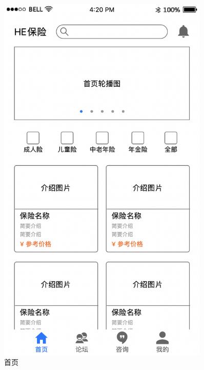 \documentclass[a4paper]{ctexart}
\begin{document}
\begin{figure}[H]
  \centering
  \begin{minipage}[t]{0.3\textwidth}
  \centering
  \includegraphics[width=0.9\textwidth]{prototype1}
  \caption{首页}
  \end{minipage}
  \begin{minipage}[t]{0.3\textwidth}
  \centering

\end{minipage}
\end{figure}
\end{document}
